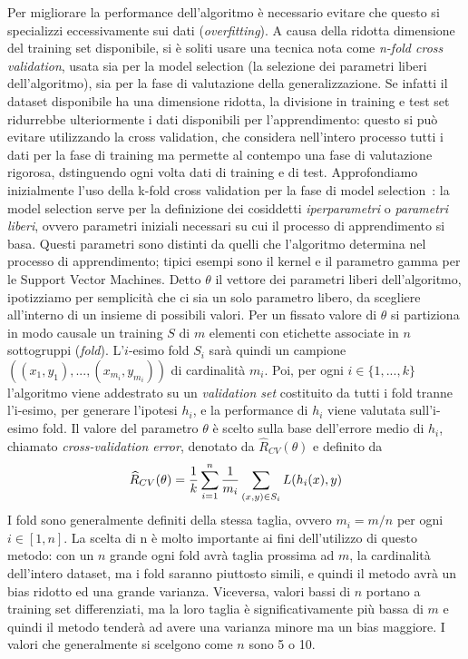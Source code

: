 \documentclass[oneside, openany]{book}
\begin{document}
		Per migliorare la performance dell'algoritmo è necessario evitare che questo si specializzi eccessivamente sui dati (\textit{overfitting}). A causa della ridotta dimensione del training set disponibile, si è soliti usare una tecnica nota come \textit{n-fold cross validation}, usata sia per la model selection (la selezione dei parametri liberi dell'algoritmo), sia per la fase di valutazione della generalizzazione. Se infatti il dataset disponibile ha una dimensione ridotta, la divisione in training e test set ridurrebbe ulteriormente i dati disponibili per l'apprendimento: questo si può evitare utilizzando la cross validation, che considera nell'intero processo tutti i dati per la fase di training ma permette al contempo una fase di valutazione rigorosa, dstinguendo ogni volta dati di training e di test.\newline
		Approfondiamo inizialmente l'uso della k-fold cross validation per la fase di model selection~\cite{bib:cv}: la model selection serve per la definizione dei cosiddetti \textit{iperparametri} o \textit{parametri liberi}, ovvero parametri iniziali necessari su cui il processo di apprendimento si basa. Questi parametri sono distinti da quelli che l'algoritmo determina nel processo di apprendimento; tipici esempi sono il kernel e il parametro gamma per le Support Vector Machines.\newline
		Detto $\theta$ il vettore dei parametri liberi dell'algoritmo, ipotizziamo per semplicità che ci sia un solo parametro libero, da scegliere all'interno di un insieme di possibili valori. Per un fissato valore di $\theta$ si partiziona in modo causale un training $S$ di $m$ elementi con etichette associate in $n$ sottogruppi (\textit{fold}). L'$i$-esimo fold $S_i$ sarà quindi un campione $((x_{1}, y_{1}),...,(x_{m_i},y_{m_i}))$ di cardinalità $m_i$. Poi, per ogni $i\in\{1, ..., k\}$ l'algoritmo viene addestrato su un \textit{validation set} costituito da tutti i fold tranne l'i-esimo, per generare l'ipotesi $h_i$, e la performance di $h_i$ viene valutata sull'i-esimo fold. Il valore del parametro $\theta$ è scelto sulla base dell'errore medio di $h_i$, chiamato \textit{cross-validation error}, denotato da $\widehat{R}_{CV}(\theta)$ e definito da
		\[
		\widehat{R}_{CV}(\theta)={1\over k}\sum_{i=1}^n {1\over m_i}\sum_{(x,y)\in S_i} L(h_i(x),y)
		\]
		I fold sono generalmente definiti della stessa taglia, ovvero $m_i=m/n$ per ogni $i\in[1,n]$. La scelta di n è molto importante ai fini dell'utilizzo di questo metodo: con un $n$ grande ogni fold avrà taglia prossima ad $m$, la cardinalità dell'intero dataset, ma i fold saranno piuttosto simili, e quindi il metodo avrà un bias ridotto ed una grande varianza. Viceversa, valori bassi di $n$ portano a training set differenziati, ma la loro taglia è significativamente più bassa di $m$ e quindi il metodo tenderà ad avere una varianza minore ma un bias maggiore. I valori che generalmente si scelgono come $n$ sono 5 o 10.\newline
\end{document}
